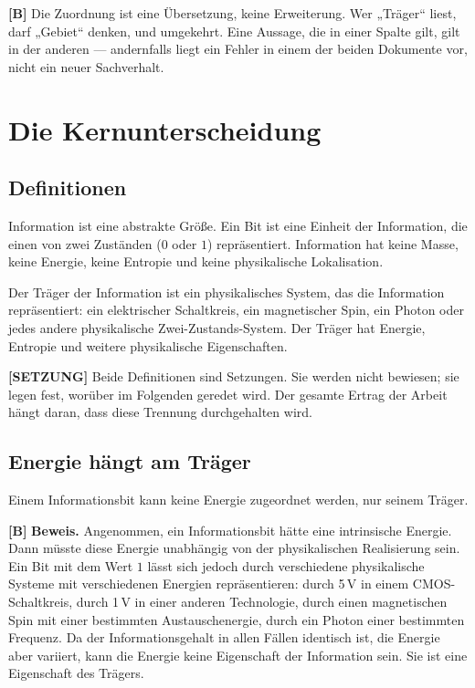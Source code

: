 \textbf{[B]} Die Zuordnung ist eine Übersetzung, keine Erweiterung. Wer „Träger“ liest,
darf „Gebiet“ denken, und umgekehrt. Eine Aussage, die in einer Spalte gilt, gilt
in der anderen --- andernfalls liegt ein Fehler in einem der beiden Dokumente vor,
nicht ein neuer Sachverhalt.

\section{Die Kernunterscheidung}

\subsection{Definitionen}

\begin{definition}[Information]
Information ist eine abstrakte Größe. Ein Bit ist eine Einheit der Information,
die einen von zwei Zuständen ($0$ oder $1$) repräsentiert. Information hat keine
Masse, keine Energie, keine Entropie und keine physikalische Lokalisation.
\end{definition}

\begin{definition}[Träger]
Der Träger der Information ist ein physikalisches System, das die Information
repräsentiert: ein elektrischer Schaltkreis, ein magnetischer Spin, ein Photon
oder jedes andere physikalische Zwei-Zustands-System. Der Träger hat Energie,
Entropie und weitere physikalische Eigenschaften.
\end{definition}

\textbf{[SETZUNG]} Beide Definitionen sind Setzungen. Sie werden nicht bewiesen; sie legen fest,
worüber im Folgenden geredet wird. Der gesamte Ertrag der Arbeit hängt daran, dass
diese Trennung durchgehalten wird.

\subsection{Energie hängt am Träger}

\begin{theorem}
Einem Informationsbit kann keine Energie zugeordnet werden, nur seinem Träger.
\end{theorem}

\textbf{[B]} \textbf{Beweis.} Angenommen, ein Informationsbit hätte eine intrinsische
Energie. Dann müsste diese Energie unabhängig von der physikalischen Realisierung
sein. Ein Bit mit dem Wert $1$ lässt sich jedoch durch verschiedene physikalische
Systeme mit verschiedenen Energien repräsentieren: durch 5\,V in einem
CMOS-Schaltkreis, durch 1\,V in einer anderen Technologie, durch einen
magnetischen Spin mit einer bestimmten Austauschenergie, durch ein Photon einer
bestimmten Frequenz. Da der Informationsgehalt in allen Fällen identisch ist, die
Energie aber variiert, kann die Energie keine Eigenschaft der Information sein.
Sie ist eine Eigenschaft des Trägers. \hfill\qedsq

